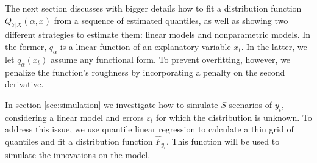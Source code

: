 The next section discusses with bigger details how to fit a distribution function $Q_{Y|X}(\alpha,x)$ from a sequence of estimated quantiles, as well as showing two different strategies to estimate them: linear models and nonparametric models. In the former, $q_\alpha$ is a linear function of an explanatory variable $x_t$.
In the latter, we let $q_\alpha(x_t)$ assume any functional form. To prevent overfitting, however, we penalize the function's roughness by incorporating a penalty on the second derivative.

In section \ref{sec:simulation} we investigate how to simulate $S$ scenarios of $y_t$, considering a linear model and errors $\varepsilon_t$ for which the distribution is unknown. To address this issue, we use quantile linear regression to calculate a thin grid of quantiles and fit a distribution function $\hat{F}_{y_t}$. This function will be used to simulate the innovations on the model.
